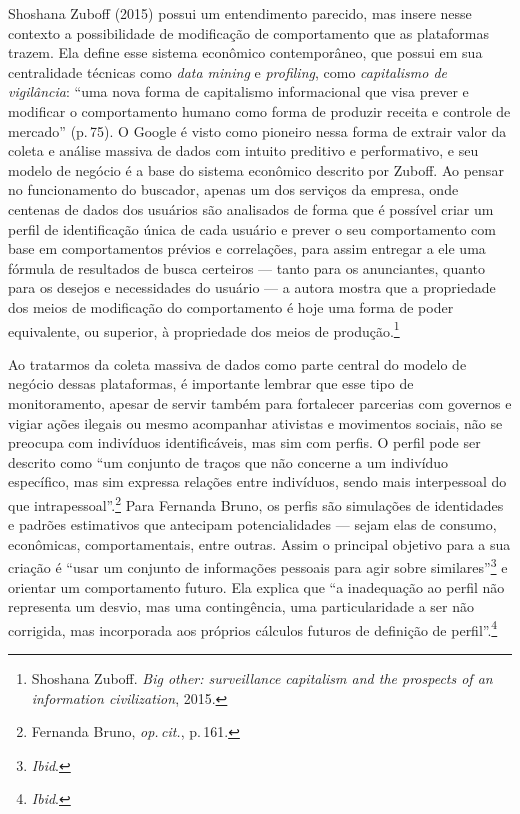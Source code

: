 Shoshana Zuboff (2015) possui um entendimento parecido, mas insere nesse
contexto a possibilidade de modificação de comportamento que as
plataformas trazem. Ela define esse sistema econômico contemporâneo, que
possui em sua centralidade técnicas como \textit{data mining} e
\textit{profiling}, como \textit{capitalismo de vigilância}: ``uma nova forma de
capitalismo informacional que visa prever e modificar o comportamento
humano como forma de produzir receita e controle de mercado'' (p.\,75). O
Google é visto como pioneiro nessa forma de extrair valor da coleta e
análise massiva de dados com intuito preditivo e performativo, e seu
modelo de negócio é a base do sistema econômico descrito por Zuboff. Ao
pensar no funcionamento do buscador, apenas um dos serviços da empresa,
onde centenas de dados dos usuários são analisados de forma que é
possível criar um perfil de identificação única de cada usuário e prever
o seu comportamento com base em comportamentos prévios e correlações,
para assim entregar a ele uma fórmula de resultados de busca certeiros
--- tanto para os anunciantes, quanto para os desejos e necessidades do
usuário --- a autora mostra que a propriedade dos meios de modificação do
comportamento é hoje uma forma de poder equivalente, ou superior, à
propriedade dos meios de produção.\footnote{Shoshana Zuboff. \textit{Big other: surveillance capitalism and the
prospects of an information civilization}, 2015.}

Ao tratarmos da coleta massiva de dados como parte central do modelo de
negócio dessas plataformas, é importante lembrar que esse tipo de
monitoramento, apesar de servir também para fortalecer parcerias com
governos e vigiar ações ilegais ou mesmo acompanhar ativistas e
movimentos sociais, não se preocupa com indivíduos identificáveis, mas
sim com perfis. O perfil pode ser descrito como ``um conjunto de traços
que não concerne a um indivíduo específico, mas sim expressa relações
entre indivíduos, sendo mais interpessoal do que intrapessoal''.\footnote{Fernanda Bruno, \textit{op.\,cit.}, p.\,161.} Para Fernanda Bruno, os perfis são simulações de identidades e
padrões estimativos que antecipam potencialidades ­--- sejam elas de
consumo, econômicas, comportamentais, entre outras. Assim o principal
objetivo para a sua criação é ``usar um conjunto de informações pessoais
para agir sobre similares''\footnote{\textit{Ibid}.} e orientar um comportamento futuro.
Ela explica que ``a inadequação ao perfil não representa um desvio, mas
uma contingência, uma particularidade a ser não corrigida, mas
incorporada aos próprios cálculos futuros de definição de
perfil''.\footnote{\textit{Ibid}.}

